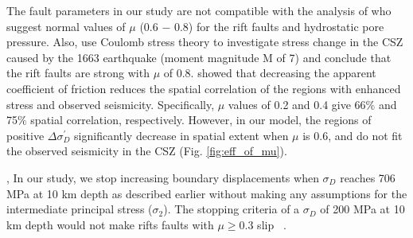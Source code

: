 \documentclass[draft]{agujournal2018}
\begin{document}
The fault parameters in our study are not compatible with the analysis of \citet{Hurd_Zoback_2012,Hurd_Zoback2012b} who suggest normal values of $\mu$ (0.6 $-$ 0.8) for the rift faults and hydrostatic pore pressure. Also, \citet{Fereidoni2014} use Coulomb stress theory to investigate stress change in the CSZ caused by the 1663 earthquake (moment magnitude M of 7) and conclude that the rift faults are strong with $\mu$ of 0.8. \citet{Fereidoni2014} showed that decreasing the apparent coefficient of friction reduces the spatial correlation of the regions with enhanced stress and observed seismicity. Specifically, $\mu$ values of 0.2 and 0.4 give 66$\%$ and 75$\%$ spatial correlation, respectively. However, in our model, the regions of positive $\Delta\sigma_{D}^\prime$ significantly decrease in spatial extent when $\mu$ is 0.6, and do not fit the observed seismicity in the CSZ (Fig. \ref{fig:eff_of_mu}).

 \citet{Hurd_Zoback_2012,Hurd_Zoback2012b,Fereidoni2014}, \citet{Baird_2010}  In our study, we stop increasing boundary displacements when $\sigma_{D}$ reaches 706 MPa at 10 km depth as described earlier without making any assumptions for the intermediate principal stress ($\sigma_2$).  \citet{Baird_2010}  The stopping criteria of a $\sigma_{D}$ of 200 MPa at 10 km depth would not make rifts faults with $\mu \ge 0.3$ slip ~\citep[e.g.,][]{ChenChen18}. 
\end{document}
